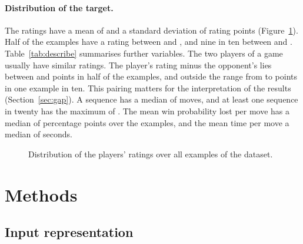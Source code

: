 \documentclass[11pt]{article}
\begin{document}
\paragraph{Distribution of the target.}
The ratings have a mean of  and a standard deviation of
 rating points (Figure~\ref{fig:label}). Half of the examples
have a rating between  and
, and nine in ten between
 and .
Table~\ref{tab:describe} summarises further variables. The two players of a
game usually have similar ratings. The player's rating minus the opponent's
lies between  and  points in
half of the examples, and outside the range from  to
 points in one example in ten. This pairing matters
for the interpretation of the results (Section~\ref{sec:gap}). A sequence has
a median of  moves, and at least one sequence in twenty
has the maximum of . The mean win probability lost per
move has a median of  percentage points over the
examples, and the mean time per move a median of 
seconds.

\begin{figure}[htbp]\centering
{}
\caption{Distribution of the players' ratings over all examples of the
dataset.}
\label{fig:label}
\end{figure}

\begin{table}[htbp]\centering\small
{}
\caption{Summary statistics of selected variables over the whole dataset:
the mean, five quantiles, the minimum and the maximum. The rating difference
is the player's rating minus the opponent's. Neither rating is an input.}
\label{tab:describe}
\end{table}
\fi

\section{Methods}
\label{sec:methods}

\subsection{Input representation}
\label{sec:input}


\end{document}
